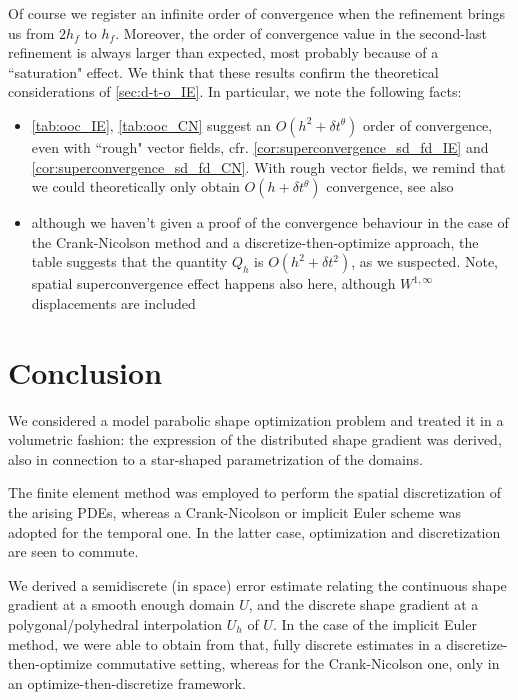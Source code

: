 \documentclass[english,a4paper,10pt,oneside]{scrbook}	%
\theoremstyle{break}
\theoremstyle{remark}
\newcommand{\te}{\theta}
\begin{document}
Of course we register an infinite order of convergence when the refinement brings us from $2h_f$ to $h_f$. Moreover, the order of convergence value in the second-last refinement is always larger than expected, most probably because of a ``saturation" effect. We think that these results confirm the theoretical considerations of \cref{sec:d-t-o_IE}. In particular, we note the following facts:

\begin{itemize}
	\item \cref{tab:ooc_IE}, \cref{tab:ooc_CN} suggest an $O(h^2+\delta t^\te)$ order of convergence, even with ``rough" vector fields, cfr. \cref{cor:superconvergence_sd_fd_IE} and \cref{cor:superconvergence_sd_fd_CN}. With rough vector fields, we remind that we could theoretically only obtain $O(h+\delta t^\te)$ convergence, see also \cite{paganini}
	\item although we haven't given a proof of the convergence behaviour in the case of the Crank-Nicolson method and a discretize-then-optimize approach, the table suggests that the quantity $Q_h$ is $O(h^2+\delta t^2)$, as we suspected. Note, spatial superconvergence effect happens also here, although $W^{1,\infty}$ displacements are included 
\end{itemize}

\chapter{Conclusion}
\label{chap:conclusion}

We considered a model parabolic shape optimization problem and treated it in a volumetric fashion: the expression of the distributed shape gradient was derived, also in connection to a star-shaped parametrization of the domains.

The finite element method was employed to perform the spatial discretization of the arising PDEs, whereas a Crank-Nicolson or implicit Euler scheme was adopted for the temporal one. In the latter case, optimization and discretization are seen to commute.

We derived a semidiscrete (in space) error estimate relating the continuous shape gradient at a smooth enough domain $U$, and the discrete shape gradient at a polygonal/polyhedral interpolation $U_h$ of $U$. In the case of the implicit Euler method, we were able to obtain from that, fully discrete estimates in a discretize-then-optimize commutative setting, whereas for the Crank-Nicolson one, only in an optimize-then-discretize framework.
\end{document}

